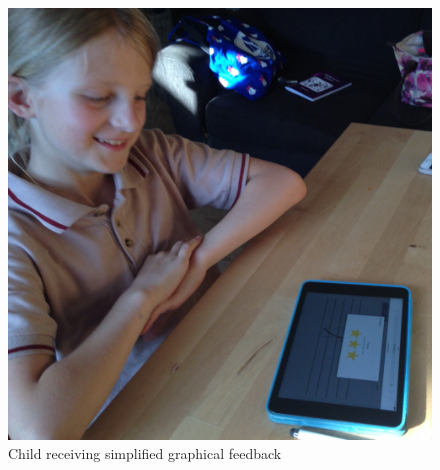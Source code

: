 \begin{figure}[H]
  \includegraphics[width=\linewidth]{gfx/photos/user-receiving-feedback.jpg}
  \caption{Child receiving simplified graphical feedback}
\end{figure}
